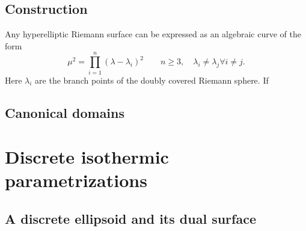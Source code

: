\documentclass{article}
\begin{document}
\subsection{Construction}
Any hyperelliptic Riemann surface can be expressed as an algebraic curve of the form
\[ \mu^2 = \prod_{i=1}^n(\lambda-\lambda_i)^2 \quad\quad n\geq3,\quad \lambda_i\neq \lambda_j \forall i\neq j.\]
Here $\lambda_i$ are the branch points of the doubly covered Riemann sphere. If 

\subsection{Canonical domains}

\section{Discrete isothermic parametrizations}
\subsection{A discrete ellipsoid and its dual surface}
\end{document}
